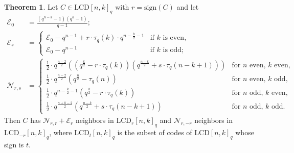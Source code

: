 \documentclass[11pt]{article}
\theoremstyle{definition}
\newtheorem{theorem}{Theorem}[section]
\newcommand{\Sign}{\mathrm{sign}}
\newcommand{\LCDq}[2]{\mathrm{LCD} {[#1, #2]}_q}
\newcommand{\CurE}{\mathcal{E}}
\newcommand{\CurN}{\mathcal{N}}
\newcommand{\Tauq}[1]{\tau_q (#1)}
\begin{document}
\begin{theorem}\label{thm:odd-q-neighbor-counts}
	Let $C \in \LCDq{n}{k}$ with $r = \Sign(C)$ and let
	\begin{align*}
		\CurE_0 &= \frac{(q^{n - k} - 1)(q^k - 1)}{q - 1}; \\
		\CurE_r &= \begin{cases}
			\CurE_0 - q^{n - 1} + r \cdot \Tauq{k} \cdot q^{n - \tfrac{k}{2} - 1}
			&\text{if $k$ is even,} \\
			\CurE_0 - q^{n - 1}
			&\text{if $k$ is odd;}
		\end{cases} \\
		\CurN_{r, s} &= \begin{cases}
			\tfrac{1}{2} \cdot q^{\frac{n - 2}{2}} \left(
				\left( q^{\frac{k}{2}} - r \cdot \Tauq{k} \right)
				\left( q^{\frac{n - k}{2}} + s \cdot \Tauq{n - k + 1} \right)
			\right)
			&\text{for $n$ even, $k$ even,} \\
			\tfrac{1}{2} \cdot q^{\frac{n - 2}{2}} \left(
				q^{\frac{n}{2}} - \Tauq{n}
			\right)
			&\text{for $n$ even, $k$ odd,} \\
			\tfrac{1}{2} \cdot q^{n - \tfrac{k}{2} - 1} \left(
				q^{\frac{k}{2}} - r \cdot \Tauq{k}
			\right)
			&\text{for $n$ odd, $k$ even,} \\
			\tfrac{1}{2} \cdot q^{\frac{n + k - 2}{2}} \left(
				q^{\frac{n - k}{2}} + s \cdot \Tauq{n - k + 1}
			\right)
			&\text{for $n$ odd, $k$ odd.}
		\end{cases}
	\end{align*}
	Then $C$ has $\CurN_{r, r} + \CurE_r$ neighbors in $\mathrm{LCD}_r {[n, k]}_q$ and $\CurN_{r, -r}$ neighbors in $\mathrm{LCD}_{-r} {[n, k]}_q$, where $\mathrm{LCD}_t{[n, k]}_q$ is the subset of codes of $\mathrm{LCD}{[n, k]}_q$ whose sign is $t$.
\end{theorem}
\end{document}
